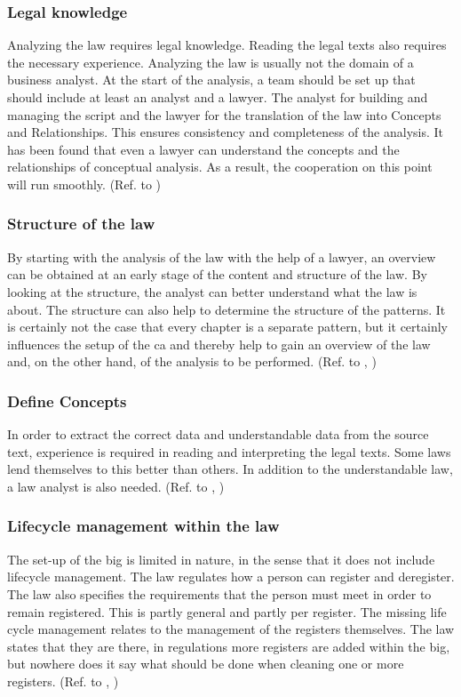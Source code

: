\subsubsection{Legal knowledge}\label{subsub:3_legal_knowledge}
Analyzing the law requires legal knowledge.
Reading the legal texts also requires the necessary experience.
Analyzing the law is usually not the domain of a business analyst.
At the start of the analysis, a team should be set up that should include at least an analyst and a lawyer.
The analyst for building and managing the script and the lawyer for the translation of the law into Concepts and Relationships.
This ensures consistency and completeness of the analysis.
It has been found that even a lawyer can understand the concepts and the relationships of conceptual analysis.
As a result, the cooperation on this point will run smoothly.
(Ref. to ) 

\subsubsection{Structure of the law}\label{subsub:3_structure_of_the_law}
By starting with the analysis of the law with the help of a lawyer, an overview can be obtained at an early stage of the content and structure of the law.
By looking at the structure, the analyst can better understand what the law is about.
The structure can also help to determine the structure of the patterns.
It is certainly not the case that every chapter is a separate pattern, but it certainly influences the setup of the \acrlong{ca} and thereby help to gain an overview of the law and, on the other hand, of the analysis to be performed.
(Ref. to , )

\subsubsection{Define Concepts}\label{subsub:3_define_concepts}
In order to extract the correct data and understandable data from the source text, experience is required in reading and interpreting the legal texts.
Some laws lend themselves to this better than others.
In addition to the understandable law, a law analyst is also needed.
(Ref. to , )

\subsubsection{Lifecycle management within the law}\label{subsub:3_lifecycle}
The set-up of the \acrshort{big} is limited in nature, in the sense that it does not include lifecycle management.
The law regulates how a person can register and deregister.
The law also specifies the requirements that the person must meet in order to remain registered.
This is partly general and partly per register.
The missing life cycle management relates to the management of the registers themselves.
The law states that they are there, in regulations more registers are added within the \acrshort{big}, but nowhere does it say what should be done when cleaning one or more registers.
(Ref. to ,  )

